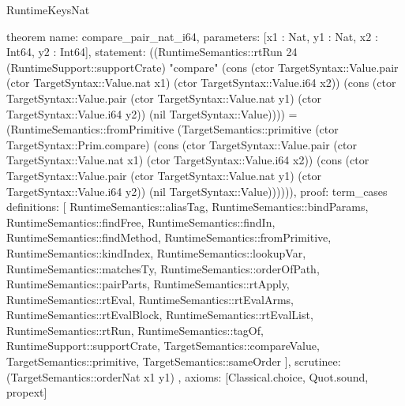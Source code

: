 \begin{lexlean}{RuntimeKeysNat}
\begin{semanticmodule}
theorem{
  name: compare_pair_nat_i64,
  parameters: [x1 : Nat, y1 : Nat, x2 : Int64, y2 : Int64],
  statement: ((RuntimeSemantics::rtRun 24 (RuntimeSupport::supportCrate) "compare" (cons (ctor TargetSyntax::Value.pair (ctor TargetSyntax::Value.nat x1) (ctor TargetSyntax::Value.i64 x2)) (cons (ctor TargetSyntax::Value.pair (ctor TargetSyntax::Value.nat y1) (ctor TargetSyntax::Value.i64 y2)) (nil TargetSyntax::Value)))) = (RuntimeSemantics::fromPrimitive (TargetSemantics::primitive (ctor TargetSyntax::Prim.compare) (cons (ctor TargetSyntax::Value.pair (ctor TargetSyntax::Value.nat x1) (ctor TargetSyntax::Value.i64 x2)) (cons (ctor TargetSyntax::Value.pair (ctor TargetSyntax::Value.nat y1) (ctor TargetSyntax::Value.i64 y2)) (nil TargetSyntax::Value)))))),
  proof: term_cases{
    definitions: [
      RuntimeSemantics::aliasTag,
      RuntimeSemantics::bindParams,
      RuntimeSemantics::findFree,
      RuntimeSemantics::findIn,
      RuntimeSemantics::findMethod,
      RuntimeSemantics::fromPrimitive,
      RuntimeSemantics::kindIndex,
      RuntimeSemantics::lookupVar,
      RuntimeSemantics::matchesTy,
      RuntimeSemantics::orderOfPath,
      RuntimeSemantics::pairParts,
      RuntimeSemantics::rtApply,
      RuntimeSemantics::rtEval,
      RuntimeSemantics::rtEvalArms,
      RuntimeSemantics::rtEvalBlock,
      RuntimeSemantics::rtEvalList,
      RuntimeSemantics::rtRun,
      RuntimeSemantics::tagOf,
      RuntimeSupport::supportCrate,
      TargetSemantics::compareValue,
      TargetSemantics::primitive,
      TargetSemantics::sameOrder
    ],
    scrutinee: (TargetSemantics::orderNat x1 y1)
  },
  axioms: [Classical.choice, Quot.sound, propext]
}
\end{semanticmodule}
\end{lexlean}
